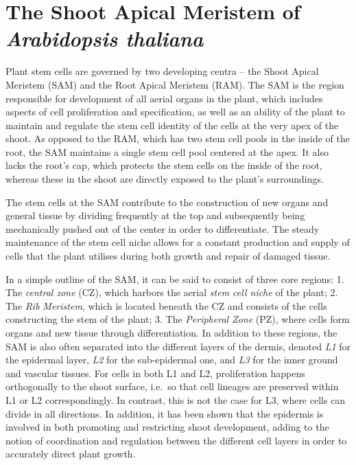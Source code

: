 \section{The Shoot Apical Meristem of \textit{Arabidopsis thaliana}} %
Plant stem cells are governed by two developing centra -- the Shoot Apical
Meristem (SAM) and the Root Apical Meristem (RAM). The SAM is the region
responsible for development of all aerial organs in the plant, which includes
aspects of cell proliferation and specification, as well as an ability of the plant to
maintain and regulate the stem cell identity of the cells at the very apex of
the shoot. \CITE As opposed to the RAM, which has two stem cell pools in the
inside of the root, the SAM maintains a single stem cell pool centered at the
apex. It also lacks the root's cap, which protects the stem cells on the inside
of the root, whereas these in the shoot are directly exposed to the plant's surroundings. 

The stem cells at the SAM contribute to the construction of new organs and
general tissue by dividing frequently at the top and subsequently being
mechanically pushed out of the center in order to differentiate. The steady
maintenance of the stem cell niche allows for a constant production and supply
of cells that the plant utilises during both growth and repair of damaged
tissue. \CITE

In a simple outline of the SAM, it can be said to consist of three core regions:
1. The \textit{central zone} (CZ), which harbors the aerial \textit{stem cell niche} 
of the plant; 2. The \textit{Rib Meristem}, which is located beneath
the CZ and consists of the cells constructing the stem of the plant; 3. The
\textit{Peripheral Zone} (PZ), where cells form organs and new tissue through
differentiation. In addition to these regions, the SAM is also often separated
into the different layers of the dermis, denoted \textit{L1} for the epidermal
layer, \textit{L2} for the sub-epidermal one, and \textit{L3} for the inner ground
and vascular tissues. For cells in both L1 and L2, proliferation happens
orthogonally to the shoot surface, i.e.\ so that cell lineages are preserved
within L1 or L2 correspondingly. In contrast, this is not the case for L3, where
cells can divide in all directions. In addition, it has been shown that the epidermis is
involved in both promoting and restricting shoot development, adding to the
notion of coordination and regulation between the different cell layers in order
to accurately direct plant growth. %


